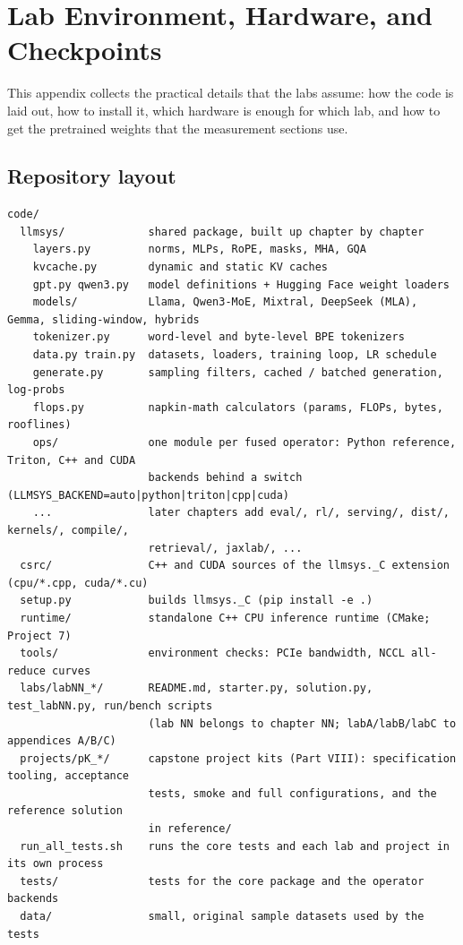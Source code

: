 \chapter{Lab Environment, Hardware, and Checkpoints}\label{app:setup}

This appendix collects the practical details that the labs assume: how the code is laid out,
how to install it, which hardware is enough for which lab, and how to get the pretrained weights
that the measurement sections use.

\section{Repository layout}

\begin{lstlisting}[style=plain]
code/
  llmsys/             shared package, built up chapter by chapter
    layers.py         norms, MLPs, RoPE, masks, MHA, GQA
    kvcache.py        dynamic and static KV caches
    gpt.py qwen3.py   model definitions + Hugging Face weight loaders
    models/           Llama, Qwen3-MoE, Mixtral, DeepSeek (MLA), Gemma, sliding-window, hybrids
    tokenizer.py      word-level and byte-level BPE tokenizers
    data.py train.py  datasets, loaders, training loop, LR schedule
    generate.py       sampling filters, cached / batched generation, log-probs
    flops.py          napkin-math calculators (params, FLOPs, bytes, rooflines)
    ops/              one module per fused operator: Python reference, Triton, C++ and CUDA
                      backends behind a switch (LLMSYS_BACKEND=auto|python|triton|cpp|cuda)
    ...               later chapters add eval/, rl/, serving/, dist/, kernels/, compile/,
                      retrieval/, jaxlab/, ...
  csrc/               C++ and CUDA sources of the llmsys._C extension (cpu/*.cpp, cuda/*.cu)
  setup.py            builds llmsys._C (pip install -e .)
  runtime/            standalone C++ CPU inference runtime (CMake; Project 7)
  tools/              environment checks: PCIe bandwidth, NCCL all-reduce curves
  labs/labNN_*/       README.md, starter.py, solution.py, test_labNN.py, run/bench scripts
                      (lab NN belongs to chapter NN; labA/labB/labC to appendices A/B/C)
  projects/pK_*/      capstone project kits (Part VIII): specification tooling, acceptance
                      tests, smoke and full configurations, and the reference solution
                      in reference/
  run_all_tests.sh    runs the core tests and each lab and project in its own process
  tests/              tests for the core package and the operator backends
  data/               small, original sample datasets used by the tests
\end{lstlisting}

